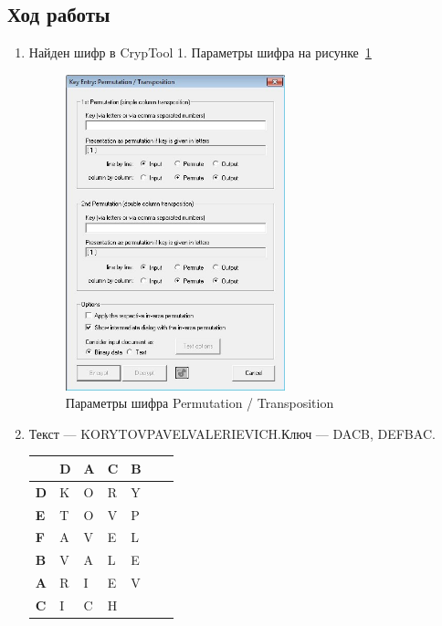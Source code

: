 \documentclass[a4paper, 14pt]{extarticle}
\begin{document}
\subsection{Ход работы}
\begin{enumerate}
    \item Найден шифр в CrypTool 1. Параметры шифра на рисунке~\ref{img:2:1}
    \begin{figure}[h]
        \centering
        \includegraphics[width=0.6\textwidth]{./img/S007.jpg}
        \caption{Параметры шифра Permutation / Transposition}%
        \label{img:2:1}
    \end{figure}
    \item Текст --- KORYTOVPAVELVALERIEVICH.\@ Ключ --- DACB, DEFBAC.\@ 
    \begin{table}[h]
        \centering
        \begin{tabular}{@{}l|llllll@{}} %
         & \textbf{D} & \textbf{A} & \textbf{C} & \textbf{B} \\ \midrule
        \textbf{D} & K & O & R & Y \\
        \textbf{E} & T & O & V & P \\
        \textbf{F} & A & V & E & L \\
        \textbf{B} & V & A & L & E \\
        \textbf{A} & R & I & E & V \\
        \textbf{C} & I & C & H &
        \end{tabular}%
        \hspace{1cm}

\end{table}
\end{enumerate}
\end{document}

